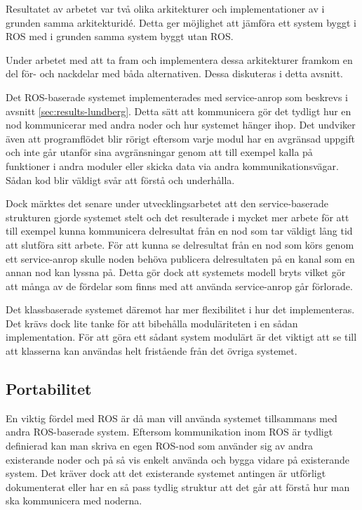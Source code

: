 Resultatet av arbetet var två olika arkitekturer och implementationer av i grunden samma arkitekturidé. Detta ger möjlighet att jämföra ett system byggt i ROS med i grunden samma system byggt utan ROS.

Under arbetet med att ta fram och implementera dessa arkitekturer framkom en del för- och nackdelar med båda alternativen. Dessa diskuteras i detta avsnitt.

Det ROS-baserade systemet implementerades med service-anrop som beskrevs i avsnitt \ref{sec:results-lundberg}. Detta sätt att kommunicera gör det tydligt hur en nod kommunicerar med andra noder och hur systemet hänger ihop. Det undviker även att programflödet blir rörigt eftersom varje modul har en avgränsad uppgift och inte går utanför sina avgränsningar genom att till exempel kalla på funktioner i andra moduler eller skicka data via andra kommunikationsvägar. Sådan kod blir väldigt svår att förstå och underhålla.

Dock märktes det senare under utvecklingsarbetet att den service-baserade strukturen gjorde systemet stelt och det resulterade i mycket mer arbete för att till exempel kunna kommunicera delresultat från en nod som tar väldigt lång tid att slutföra sitt arbete. För att kunna se delresultat från en nod som körs genom ett service-anrop skulle noden behöva publicera delresultaten på en kanal som en annan nod kan lyssna på. Detta gör dock att systemets modell bryts vilket gör att många av de fördelar som finns med att använda service-anrop går förlorade.

Det klassbaserade systemet däremot har mer flexibilitet i hur det implementeras. Det krävs dock lite tanke för att bibehålla moduläriteten i en sådan implementation. För att göra ett sådant system modulärt är det viktigt att se till att klasserna kan användas helt fristående från det övriga systemet.

\subsection{Portabilitet}
En viktig fördel med ROS är då man vill använda systemet tillsammans med andra ROS-baserade system. Eftersom kommunikation inom ROS är tydligt definierad kan man skriva en egen ROS-nod som använder sig av andra existerande noder och på så vis enkelt använda och bygga vidare på existerande system. Det kräver dock att det existerande systemet antingen är utförligt dokumenterat eller har en så pass tydlig struktur att det går att förstå hur man ska kommunicera med noderna.

